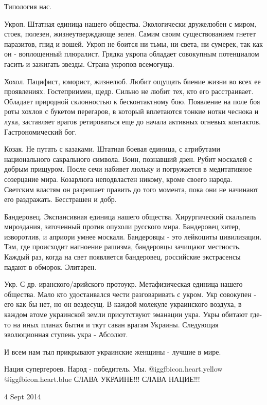  
 
 
 
 

Типология нас.

Укроп. Штатная единица нашего общества. Экологически дружелюбен с миром, стоек,
полезен, жизнеутверждающе зелен. Самим своим существованием гнетет паразитов,
гнид и вошей. Укроп не боится ни тьмы, ни света, ни сумерек, так как он -
воплощенный плюралист. Грядка укропа обладает совокупным потенциалом гасить и
зажигать звезды. Страна укропов всемогуща.

Хохол. Пацифист, юморист, жизнелюб. Любит ощущать биение жизни во всех ее
проявлениях. Гостеприимен, щедр. Сильно не любит тех, кто его расстраивает.
Обладает природной склонностью к бесконтактному бою.  Появление на поле боя
роты хохлов с букетом перегаров, в который вплетаются тонкие нотки чеснока и
лука, заставляет врагов ретироваться еще до начала активных огневых контактов.
Гастрономический бог.

Козак. Не путать с казаками. Штатная боевая единица, с атрибутами национального
сакрального символа. Воин, познавший дзен. Рубит москалей с добрым прищуром.
После сечи набивет люльку и погружается в медитативное созерцание мира.
Козарлюга неподвластен никому, кроме своего народа.  Светским властям он
разрешает править до того момента, пока они не начинают его раздражать.
Бесстрашен и добр.

Бандеровец. Экспансивная единица нашего общества. Хирургический скальпель
мироздания, заточенный против опухоли русского мира.  Бандеровец хитер,
изворотлив, и априори умнее москаля. Бандеровцы - это лейкоциты цивилизации.
Там, где происходит нагноение рашизма, бандеровцы зачищают местность. Каждый
раз, когда на свет появляется бандеровец, российские экстрасенсы падают в
обморок. Элитарен.

Укр. С др.-иранского/арийского протоукр. Метафизическая единица нашего
общества. Мало кто удостаивался чести разговаривать с укром. Укр совокупен -
его как бы нет, но он вездесущ. В каждой молекуле украинского воздуха, в каждом
атоме украинской земли присутствуют эманации укра. Укры обитают где-то на иных
планах бытия и ткут саван врагам Украины. Следующая эволюционная ступень укра -
Абсолют.

И всем нам тыл прикрывают украинские женщины - лучшие в мире.

Нация супергероев. Народ - победитель. Мы.  @igg{fbicon.heart.yellow}
@igg{fbicon.heart.blue}  СЛАВА УКРАИНЕ!!! СЛАВА НАЦИЕ!!!

4 Sept 2014

